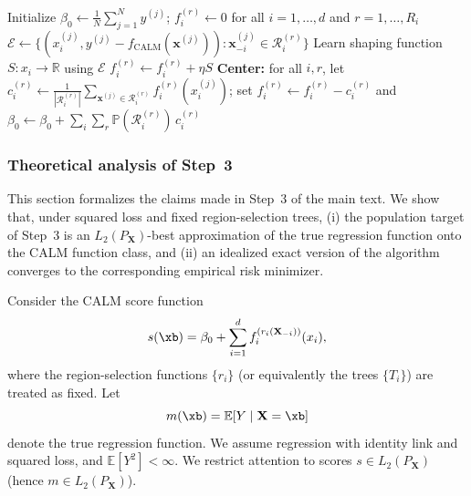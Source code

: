 \begin{algorithm}[tb]
\caption{Gradient Boosting for CALM}
\label{alg:gb-calm}
\begin{algorithmic}[1]
   \STATE Initialize $\beta_0 \leftarrow \frac{1}{N}\sum_{j=1}^N y^{(j)}$; $f_i^{(r)} \leftarrow 0$ for all $i = 1, \dots, d$ and $r = 1, \dots, R_i$
            \STATE $\mathcal{E} \leftarrow \{(x^{(j)}_i, y^{(j)} - f_{\text{CALM}}(\mathbf{x}^{(j)})) : \mathbf{x}^{(j)}_{-i} \in \mathcal{R}_i^{(r)}\}$
            \STATE Learn shaping function $S : x_i \rightarrow \mathbb{R}$ using $\mathcal{E}$
            \STATE $f_i^{(r)} \leftarrow f_i^{(r)} + \eta S$ 
         \ENDFOR
      \ENDFOR
      \STATE \textbf{Center:} for all $i, r$, let $c_i^{(r)} \leftarrow \frac{1}{|\mathcal{R}_i^{(r)}|}\sum_{\mathbf{x}^{(j)} \in \mathcal{R}_i^{(r)}} f_i^{(r)}(x_i^{(j)})$; set $f_i^{(r)} \leftarrow f_i^{(r)} - c_i^{(r)}$ and $\beta_0 \leftarrow \beta_0 + \sum_i \sum_r \mathbb{P}(\mathcal{R}_i^{(r)})\, c_i^{(r)}$ 
   \ENDFOR
\end{algorithmic}
\end{algorithm}

\subsubsection{Theoretical analysis of Step~3}
\label{app:step3-theory}

This section formalizes the claims made in Step~3 of the main text.
We show that, under squared loss and fixed region-selection trees, (i) the
population target of Step~3 is an $L_2(P_{\mathbf{X}})$-best approximation of the true regression
function onto the CALM function class, and (ii) an idealized exact version of the
algorithm converges to the corresponding empirical risk minimizer.

Consider the CALM score function
\begin{equation}
s(\xb)
=
\beta_0
+
\sum_{i=1}^d f_i^{(r_i(\mathbf{X}_{-i}))}(x_i),
\label{eq:calm-score}
\end{equation}
where the region-selection functions $\{r_i\}$ (or equivalently the trees
$\{T_i\}$) are treated as fixed.
Let
\[
m(\xb)=\mathbb{E}[Y\mid \mathbf{X}=\xb]
\]
denote the true regression function.
We assume regression with identity link and squared loss, and $\mathbb{E}[Y^2]<\infty$.
We restrict attention to scores $s\in L_2(P_{\mathbf{X}})$ (hence $m\in L_2(P_{\mathbf{X}})$).

